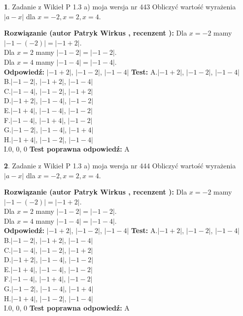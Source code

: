 \documentclass[12pt, a4paper]{article}
\theoremstyle{definition} %
\newtheorem{zad}{}
\newcommand{\zadStart}[1]{\begin{zad}#1\newline}
\newcommand{\zadStop}{\end{zad}}
\newcommand{\rozwStart}[2]{\noindent \textbf{Rozwiązanie (autor #1 , recenzent #2): }\newline}
\newcommand{\rozwStop}{\newline}
\newcommand{\odpStart}{\noindent \textbf{Odpowiedź:}\newline}
\newcommand{\odpStop}{\newline}
\newcommand{\testStart}{\noindent \textbf{Test:}\newline}
\newcommand{\testStop}{\newline}
\newcommand{\kluczStart}{\noindent \textbf{Test poprawna odpowiedź:}\newline}
\newcommand{\kluczStop}{\newline}
\begin{document}
\zadStart{Zadanie z Wikieł P 1.3 a) moja wersja nr 443}
Obliczyć wartość wyrażenia $|a - x|$ dla $x=-2,x=2,x=4$.
\zadStop
\rozwStart{Patryk Wirkus}{}
Dla $x = -2$ mamy $|-1 - (-2)| = |-1 + 2|$.\\
Dla $x = 2$ mamy $|-1 - 2| = |-1 - 2|$.\\
Dla $x = 4$ mamy $|-1 - 4| = |-1 - 4|$.\\
\rozwStop
\odpStart
$|-1 + 2|$, $|-1 - 2|$, $|-1 - 4|$
\odpStop
\testStart
A.$|-1 + 2|$, $|-1 - 2|$, $|-1 - 4|$\\
B.$|-1 - 2|$, $|-1 + 2|$, $|-1 - 4|$\\
C.$|-1 - 4|$, $|-1 - 2|$, $|-1 + 2|$\\
D.$|-1 + 2|$, $|-1 - 4|$, $|-1 - 2|$\\
E.$|-1 + 4|$, $|-1 - 4|$, $|-1 - 2|$\\
F.$|-1 - 4|$, $|-1 + 4|$, $|-1 - 2|$\\
G.$|-1 - 2|$, $|-1 - 4|$, $|-1 + 4|$\\
H.$|-1 + 4|$, $|-1 - 2|$, $|-1 - 4|$\\
I.$0$, $0$, $0$
\testStop
\kluczStart
A
\kluczStop



\zadStart{Zadanie z Wikieł P 1.3 a) moja wersja nr 444}
Obliczyć wartość wyrażenia $|a - x|$ dla $x=-2,x=2,x=4$.
\zadStop
\rozwStart{Patryk Wirkus}{}
Dla $x = -2$ mamy $|-1 - (-2)| = |-1 + 2|$.\\
Dla $x = 2$ mamy $|-1 - 2| = |-1 - 2|$.\\
Dla $x = 4$ mamy $|-1 - 4| = |-1 - 4|$.\\
\rozwStop
\odpStart
$|-1 + 2|$, $|-1 - 2|$, $|-1 - 4|$
\odpStop
\testStart
A.$|-1 + 2|$, $|-1 - 2|$, $|-1 - 4|$\\
B.$|-1 - 2|$, $|-1 + 2|$, $|-1 - 4|$\\
C.$|-1 - 4|$, $|-1 - 2|$, $|-1 + 2|$\\
D.$|-1 + 2|$, $|-1 - 4|$, $|-1 - 2|$\\
E.$|-1 + 4|$, $|-1 - 4|$, $|-1 - 2|$\\
F.$|-1 - 4|$, $|-1 + 4|$, $|-1 - 2|$\\
G.$|-1 - 2|$, $|-1 - 4|$, $|-1 + 4|$\\
H.$|-1 + 4|$, $|-1 - 2|$, $|-1 - 4|$\\
I.$0$, $0$, $0$
\testStop
\kluczStart
A
\kluczStop
\end{document}
